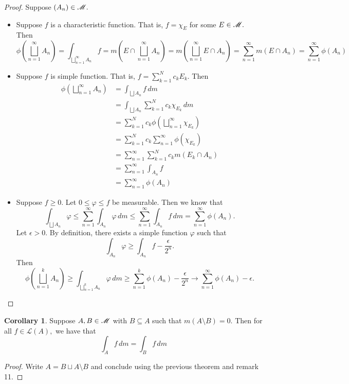 \documentclass[10pt, oneside]{article}
\newcommand{\sm}{\setminus}
\theoremstyle{definition}
\newtheorem{cor}{Corollary}
\begin{document}
\begin{proof}
Suppose $(A_n) \in \cal M.$
\begin{itemize}
    \item Suppose $f$ is a characteristic function. That is, $f = \chi_E$ for some $E\in \cal M.$ Then 
    \[\phi(\bigsqcup_{n=1}^\infty A_n) = \int_{\bigsqcup_{n=1}^\infty A_n} f = m(E \cap \bigsqcup_{n=1}^\infty A_n) = m(\bigsqcup_{n=1}^\infty E \cap A_n) = \sum_{n=1}^\infty m(E \cap A_n) = \sum_{n=1}^\infty \phi(A_n)\]
    \item Suppose $f$ is simple function. That is, $f = \sum_{k=1}^N c_k E_k.$ Then 
    \begin{align*}
    \phi(\bigsqcup_{n=1}^\infty A_n) &= \int_{\bigsqcup A_n}f \, dm\\ &= \int_{\bigsqcup A_n} \sum_{k=1}^N c_k \chi_{E_k}\, dm\\ &= \sum_{k=1}^N c_k \phi(\bigsqcup_{n=1}^\infty \chi_{E_k})\\ &= \sum_{k=1}^N c_k \sum_{n=1}^\infty \phi(\chi_{E_k})\\ &= \sum_{n=1}^\infty \sum_{k=1}^N c_k m(E_k \cap A_n)\\ &= \sum_{n=1}^\infty\int_{A_n} f\\ &= \sum_{n=1}^\infty \phi(A_n)    
    \end{align*}
    \item Suppose $f \geq 0.$ Let $0\leq\varphi \leq f$ be measurable. Then we know that 
    \[\int_{\bigsqcup A_n} \varphi \leq \sum_{n=1}^\infty \int_{A_n} \varphi\, dm \leq \sum_{n=1}^\infty \int_{A_n} f \, dm = \sum_{n=1}^\infty\phi(A_n).\]
    Let $\epsilon>0.$ By definition, there exists a simple function $\varphi$ such that 
    \[\int_{A_n} \varphi \geq \int_{A_n} f - \frac{\epsilon}{2^n}.\] Then 
    \[\phi(\bigsqcup_{n=1}^k A_n) \geq \int_{\bigsqcup_{n=1}^k A_n}\varphi \, dm \geq \sum_{n=1}^k \phi(A_n) - \frac{\epsilon}{2^n} \to \sum_{n=1}^\infty \phi(A_n) - \epsilon.\]
\end{itemize}
\end{proof}

\begin{cor}
    Suppose $A, B \in \cal M$ with $B \subseteq A$ such that $m(A\sm B) = 0.$ Then for all $f\in \mathcal{L}(A),$ we have that 
    \[\int_A f \, dm = \int_B f\, dm\]
\end{cor}
\begin{proof}
    Write $A = B \sqcup A\sm B$ and conclude using the previous theorem and remark 11.
\end{proof}
\end{document}

